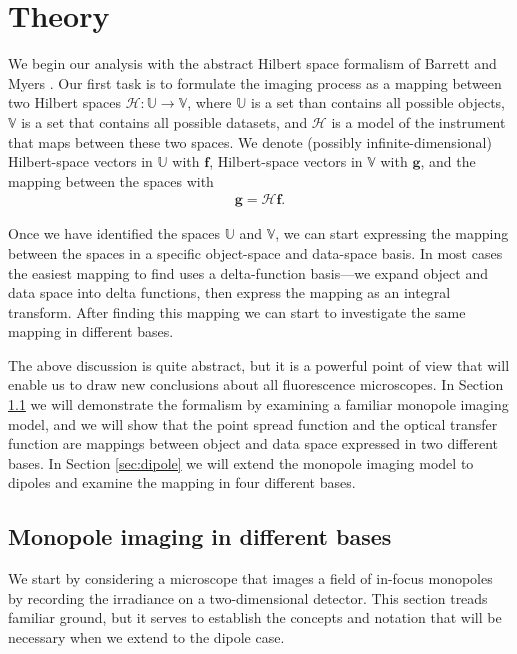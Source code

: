 \documentclass[]{osa-article}
\providecommand{\mb}[1]{\mathbf{#1}}
\providecommand{\mc}[1]{\mathcal{#1}}
\providecommand{\mbb}[1]{\mathbb{#1}}
\begin{document}
\section{Theory}\label{sec:theory}
We begin our analysis with the abstract Hilbert space formalism of Barrett and
Myers \cite{barrett2004}. Our first task is to formulate the imaging process as
a mapping between two Hilbert spaces $\mc{H}: \mbb{U} \rightarrow \mbb{V}$, where
$\mbb{U}$ is a set than contains all possible objects, $\mbb{V}$ is a set that
contains all possible datasets, and $\mc{H}$ is a model of the instrument that
maps between these two spaces. We denote (possibly infinite-dimensional)
Hilbert-space vectors in $\mbb{U}$ with $\mb{f}$, Hilbert-space vectors in
$\mbb{V}$ with $\mb{g}$, and the mapping between the spaces with
\begin{align}
  \mb{g} = \mc{H}\mb{f}.
\end{align}

Once we have identified the spaces $\mbb{U}$ and $\mbb{V}$, we can start
expressing the mapping between the spaces in a specific object-space and
data-space basis. In most cases the easiest mapping to find uses a
delta-function basis---we expand object and data space into delta functions,
then express the mapping as an integral transform. After finding this mapping we
can start to investigate the same mapping in different bases.

The above discussion is quite abstract, but it is a powerful point of view that
will enable us to draw new conclusions about all fluorescence microscopes. In
Section \ref{sec:monopole} we will demonstrate the formalism by examining a
familiar monopole imaging model, and we will show that the point spread
function and the optical transfer function are mappings between object and data
space expressed in two different bases. In Section \ref{sec:dipole} we will
extend the monopole imaging model to dipoles and examine the mapping in four
different bases. 

\subsection{Monopole imaging in different bases}\label{sec:monopole}
We start by considering a microscope that images a field of in-focus monopoles
by recording the irradiance on a two-dimensional detector. This section treads
familiar ground, but it serves to establish the concepts and notation that will
be necessary when we extend to the dipole case.
\end{document}
